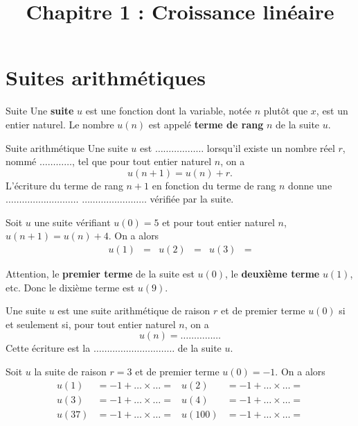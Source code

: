 \documentclass[11pt]{article}
\title{Chapitre 1 : Croissance linéaire}
\date{}
\author{}
\begin{document}
\maketitle\thispagestyle{fancy}

\section{Suites arithmétiques}
\begin{defi}{Suite}
  Une \textbf{suite} $u$ est une fonction dont la variable, notée $n$ plutôt que
  $x$, est un entier naturel. Le nombre $u(n)$ est appelé \textbf{terme de
  rang} $n$ de la suite $u$.
\end{defi}

\begin{defi}{Suite arithmétique}
  Une suite $u$ est $\ldots\ldots\ldots\ldots\ldots\ldots$ lorsqu'il existe un nombre réel $r$,
  nommé $\ldots\ldots\ldots\ldots$, tel que pour tout entier naturel $n$, on a
  \[
    u(n+1) = u(n) + r.
  \]
  L'écriture du terme de rang $n+1$ en fonction du terme de rang $n$ donne une
  $\ldots\ldots\ldots\ldots\ldots\ldots\ldots\ldots\ldots$ $\ldots\ldots\ldots\ldots\ldots\ldots\ldots\ldots$ vérifiée par la suite.
\end{defi}

\begin{exemple}
  Soit $u$ une suite vérifiant $u(0)=5$ et pour tout entier naturel $n$,
  $u(n+1)=u(n)+4$.
  On a alors
  \begin{align*}
    u(1) &= &
    u(2) &= &
    u(3) &=
  \end{align*}
\end{exemple}

\begin{rmq}
  Attention, le \textbf{premier terme} de la suite est $u(0)$, le
  \textbf{deuxième terme} $u(1)$, etc. Donc le dixième terme est $u(9)$.
\end{rmq}

\begin{prop}
  Une suite $u$ est une suite arithmétique de raison $r$ et de premier terme
  $u(0)$ si et seulement si, pour tout entier naturel $n$, on a
  \[
    u(n) = \ldots\ldots\ldots\ldots\ldots
  \]
  Cette écriture est la $\ldots\ldots\ldots\ldots\ldots\ldots\ldots\ldots\ldots\ldots$ de la suite $u$.
\end{prop}

\begin{exemple}
  Soit $u$ la suite de raison $r=3$ et de premier terme $u(0)=-1$. On a alors
  \begin{align*}
    u(1) &= -1 + \ldots\times\ldots = & 
    u(2) &= -1 + \ldots\times\ldots = \\ 
    u(3) &= -1 + \ldots\times\ldots = & 
    u(4) &= -1 + \ldots\times\ldots = \\
    u(37) &= -1 + \ldots\times\ldots = & 
    u(100) &= -1 + \ldots\times\ldots =
  \end{align*}
\end{exemple}
\end{document}
